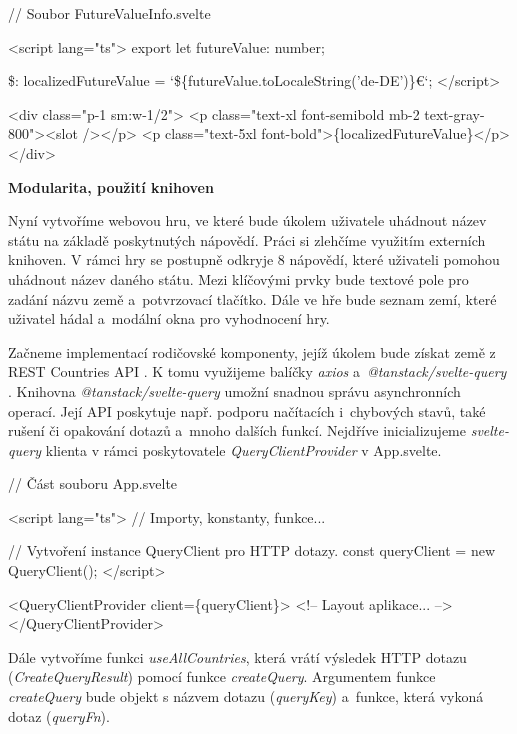 \begin{prog}
// Soubor FutureValueInfo.svelte
  
<script lang="ts">
  export let futureValue: number;

  \$: localizedFutureValue = `\$\{futureValue.toLocaleString('de-DE')\}€`;
</script>

<div class="p-1 sm:w-1/2">
  <p class="text-xl font-semibold mb-2 text-gray-800"><slot /></p>
  <p class="text-5xl font-bold">\{localizedFutureValue\}</p>
</div>
\end{prog}

\begin{flushleft}
  \textbf{Modularita, použití knihoven}
\end{flushleft}

Nyní vytvoříme webovou hru, ve které bude úkolem uživatele uhádnout název státu na základě poskytnutých nápovědí. Práci si zlehčíme využitím externích knihoven. 
V rámci hry se postupně odkryje 8 nápovědí, které uživateli pomohou uhádnout název daného státu. Mezi klíčovými prvky bude textové pole pro zadání názvu země a~potvrzovací tlačítko. 
Dále ve hře bude seznam zemí, které uživatel hádal a~modální okna pro vyhodnocení hry.

Začneme implementací rodičovské komponenty, jejíž úkolem bude získat země z REST Countries API \cite{restcountriesapi}. 
K tomu využijeme balíčky \emph{axios} \cite{axioslib} a~\emph{@tanstack/svelte-query} \cite{tanstackquerylib}. 
Knihovna \emph{@tanstack/svelte-query} umožní snadnou správu asynchronních operací. Její API poskytuje např. podporu načítacích i~chybových stavů, také rušení či opakování dotazů a~mnoho dalších funkcí. 
Nejdříve inicializujeme \emph{svelte-query} klienta v rámci poskytovatele \emph{QueryClientProvider} v App.svelte.

\begin{prog}
// Část souboru App.svelte

<script lang="ts">
  // Importy, konstanty, funkce...  

  // Vytvoření instance QueryClient pro HTTP dotazy.
  const queryClient = new QueryClient();
</script>

<QueryClientProvider client=\{queryClient\}>
  <!-- Layout aplikace... -->
</QueryClientProvider>
\end{prog}

Dále vytvoříme funkci \emph{useAllCountries}, která vrátí výsledek HTTP dotazu (\emph{CreateQueryResult}) pomocí funkce \emph{createQuery}. 
Argumentem funkce \emph{createQuery} bude objekt s názvem dotazu (\emph{queryKey}) a~funkce, která vykoná dotaz (\emph{queryFn}).

